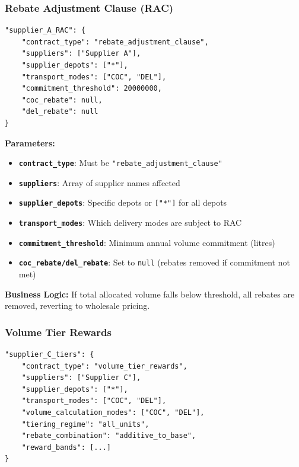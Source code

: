 \subsubsection{Rebate Adjustment Clause (RAC)}
\begin{verbatim}
"supplier_A_RAC": {
    "contract_type": "rebate_adjustment_clause",
    "suppliers": ["Supplier A"],
    "supplier_depots": ["*"],
    "transport_modes": ["COC", "DEL"],
    "commitment_threshold": 20000000,
    "coc_rebate": null,
    "del_rebate": null
}
\end{verbatim}

\textbf{Parameters:}
\begin{itemize}
    \item \textbf{\texttt{contract\_type}}: Must be \texttt{"rebate\_adjustment\_clause"}
    \item \textbf{\texttt{suppliers}}: Array of supplier names affected
    \item \textbf{\texttt{supplier\_depots}}: Specific depots or \texttt{["*"]} for all depots
    \item \textbf{\texttt{transport\_modes}}: Which delivery modes are subject to RAC
    \item \textbf{\texttt{commitment\_threshold}}: Minimum annual volume commitment (litres)
    \item \textbf{\texttt{coc\_rebate/del\_rebate}}: Set to \texttt{null} (rebates removed if commitment not met)
\end{itemize}

\textbf{Business Logic:} If total allocated volume falls below threshold, all rebates are removed, reverting to wholesale pricing.

\subsubsection{Volume Tier Rewards}
\begin{verbatim}
"supplier_C_tiers": {
    "contract_type": "volume_tier_rewards",
    "suppliers": ["Supplier C"],
    "supplier_depots": ["*"],
    "transport_modes": ["COC", "DEL"],
    "volume_calculation_modes": ["COC", "DEL"],
    "tiering_regime": "all_units",
    "rebate_combination": "additive_to_base",
    "reward_bands": [...]
}
\end{verbatim}

